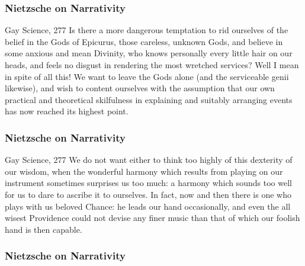 \documentclass[xcolor=dvipsnames]{beamer}
\begin{document}
\begin{frame}
  \frametitle{Nietzsche on Narrativity}
  \begin{block}{Gay Science, 277}
    Is there a more dangerous temptation to rid ourselves of the
    belief in the Gods of Epicurus, those careless, unknown Gods, and
    believe in some anxious and mean Divinity, who knows personally
    every little hair on our heads, and feels no disgust in rendering
    the most wretched services? Well I mean in spite of all this! We
    want to leave the Gods alone (and the serviceable genii likewise),
    and wish to content ourselves with the assumption that our own
    practical and theoretical skilfulness in explaining and suitably
    arranging events has now reached its highest point.
  \end{block}
\end{frame}

\begin{frame}
  \frametitle{Nietzsche on Narrativity}
  \begin{block}{Gay Science, 277}
    We do not want either to think too highly of this dexterity of our
    wisdom, when the wonderful harmony which results from playing on
    our instrument sometimes surprises us too much: a harmony which
    sounds too well for us to dare to ascribe it to ourselves. In
    fact, now and then there is one who plays with us beloved Chance:
    he leads our hand occasionally, and even the all wisest Providence
    could not devise any finer music than that of which our foolish
    hand is then capable.
  \end{block}
\end{frame}

\begin{frame}
  \frametitle{Nietzsche on Narrativity}
  
\end{frame}
\end{document}
